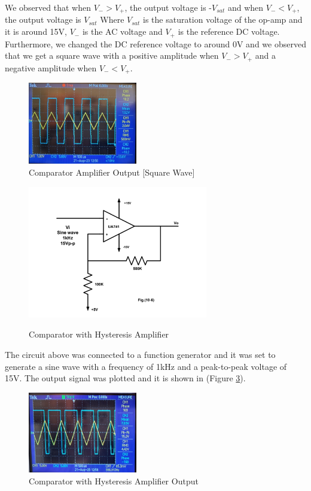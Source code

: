 \documentclass[12pt]{article}
\begin{document}
We observed that when $V_{-} > V_{+}$, the output voltage is -$V_{sat}$ and when $V_{-} < V_{+}$, the output voltage is $V_{sat}$ Where $V_{sat}$ is the saturation voltage of the op-amp and it is around 15V, $V_{-}$ is the AC voltage and $V_{+}$ is the reference DC voltage.
\\
Furthermore, we changed the DC reference voltage to around 0V and we observed that we get a square wave with a positive amplitude when $V_{-} > V_{+}$ and a negative amplitude when $V_{-} < V_{+}$.
\begin{figure}[H]
    \centering
    \includegraphics[width=0.425\textwidth]{assets//main/2023-08-27-19-45-30.png}
    \caption{Comparator Amplifier Output [Square Wave]}
    \label{fig:4}
\end{figure}
\begin{figure}[H]
    \centering
    \includegraphics[width=0.7\textwidth]{assets/main/2023-08-27-19-57-16.png}
    \caption{Comparator with Hysteresis Amplifier}
    \label{fig:5}
    \cite{manual}
\end{figure}
The circuit above was connected to a function generator and it was set to generate a sine wave with a frequency of 1kHz and a peak-to-peak voltage of 15V. The output signal was plotted and it is shown in (Figure \ref{fig:6}).
\begin{figure}[H]
    \centering
    \includegraphics[width=0.425\textwidth]{assets//main/2023-08-27-20-01-04.png}
    \caption{Comparator with Hysteresis Amplifier Output}
    \label{fig:6}
\end{figure}
\end{document}

